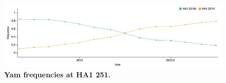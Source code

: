 \documentclass[11pt,oneside,letterpaper]{article}
\begin{document}
\begin{figure}[h!]
	\centering		
	\includegraphics[width=1.0\textwidth]{../figures/sep-2015/Yam_HA1-251_frequencies.png}
	\caption{\textbf{Yam frequencies at HA1 251.} 
	}
	\label{Yam_HA1-251_frequencies}
\end{figure}
\end{document}

